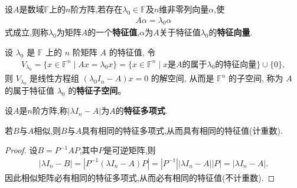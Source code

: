 \documentclass[lang=cn,newtx,10pt,scheme=chinese]{elegantbook}
\begin{document}
\begin{definition}[矩阵的特征值和特征向量]
设$A$是数域$\mathbb{F}$上的$n$阶方阵,若存在$\lambda_0 \in \mathbb{F}$及$n$维非零列向量$\alpha$,使
\begin{align*}
A \alpha = \lambda_0 \alpha
\end{align*}
式成立,则称$\lambda_0$为矩阵$A$的一个\textbf{特征值},$\alpha$为$A$关于特征值$\lambda_0$的\textbf{特征向量}.
\end{definition}

\begin{definition}[矩阵的特征子空间]
设 $\lambda_0$ 是 $\mathbb{F}$ 上的 $n$ 阶矩阵 $A$ 的特征值, 令
\begin{align*}
V_{\lambda_0} = \{x \in \mathbb{F}^n \mid Ax = \lambda_0 x\} 
= \{x \in \mathbb{F}^n \mid x \text{是} A \text{的属于} \lambda_0 \text{的特征向量}\} \cup \{0\},
\end{align*}
则 $V_{\lambda_0}$ 是线性方程组 $(\lambda_0 I_n - A)x = 0$ 的解空间, 从而是 $\mathbb{F}^n$ 的子空间, 称为 $A$ 的属于特征值 $\lambda_0$ 的\textbf{特征子空间}。
\end{definition}

\begin{definition}[特征多项式]
设$A$是$n$阶方阵,称$|\lambda I_n - A|$为$A$的\textbf{特征多项式}.
\end{definition}

\begin{theorem}[相似矩阵有相同的特征多项式与特征值]\label{theorem:相似矩阵有相同的特征多项式与特征值}
若$B$与$A$相似,则$B$与$A$具有相同的特征多项式,从而具有相同的特征值(计重数).
\end{theorem}
\begin{proof}
设$B=P^{-1}AP$,其中$P$是可逆矩阵,则
\begin{align*}
|\lambda I_n - B| = |P^{-1}(\lambda I_n - A)P| = |P^{-1}||\lambda I_n - A||P| = |\lambda I_n - A|.
\end{align*}
因此相似矩阵必有相同的特征多项式,从而必有相同的特征值(不计重数).
\end{proof}
\end{document}
